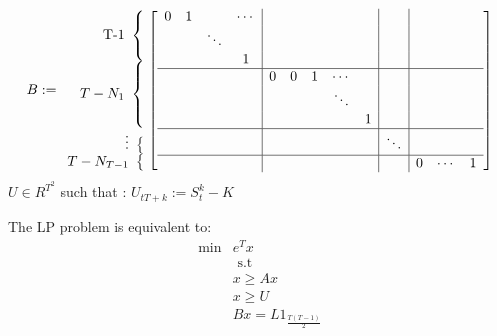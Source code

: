 \documentclass[12pt]{article}
\begin{document}
\begin{enumerate}
  \[
    B := 
    \begin{array}{r@{}}
      \text{T-1}~\left\{\begin{array}{@{}c@{}}\null\\\null\\\null\end{array}\right.\\
      T-N_1~\left\{\begin{array}{@{}c@{}}\null\\\null\\\null\\\null\end{array}\right.\\
      \text{\vdots}~\left\{\begin{array}{@{}c@{}}\null\end{array}\right.\\
     T - N_{T-1}~\left\{\begin{array}{@{}c@{}}\null\end{array}\right.\\
    \end{array}
  \left [
    \begin{array}{cccc|ccccc|c|ccc}
      0 & 1      &        &\cdots &&& &&& &&& \\
        &        & \ddots &       &&& &&& &&& \\
        &        &        & 1     &&& &&& &&& \\
      \hline
        &        &        &       & 0 & 0 & 1 & \cdots &   &&&&\\
        &        &        &       &   &   &   & \ddots &   &&&& \\
        &        &        &       &   &   &   &        & 1 &&&&\\
      \hline
        &        &        &       &   &   &   &        & & \ddots \\
      \hline
        &        &        &       &   &   &   &        & &        & 0 & \cdots & 1 \\
    \end{array}
  \right ]
\]
 $U \in R^{T^2}$ such that : $U_{tT + k} := S_t^k - K$

 The LP problem is equivalent to:
 \begin{align*}
    \min & e^T x \\
         &\text{ s.t } \\
         & x \ge Ax \\
         & x \ge U\\
         & Bx = L 1_{\frac{T(T-1)}2}
  \end{align*}



\end{enumerate}

\newpage

\end{document}
